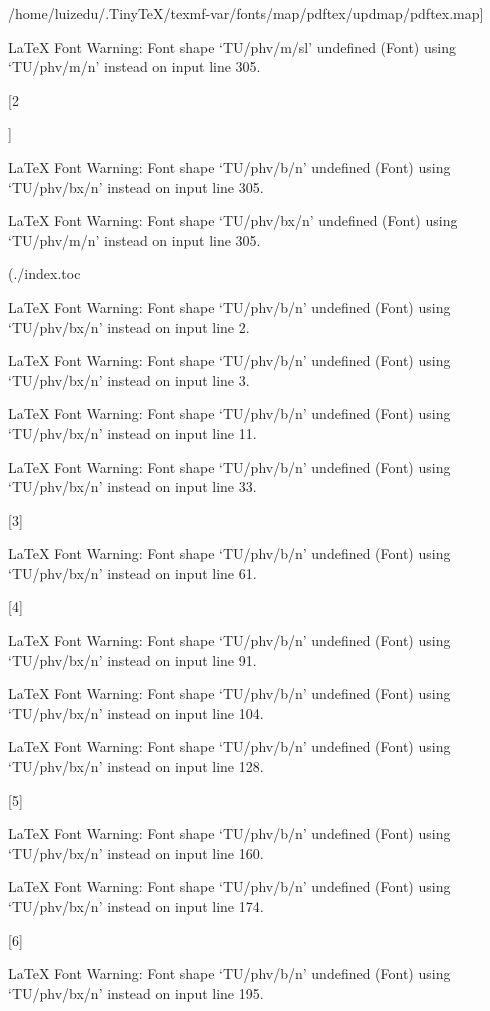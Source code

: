 {/home/luizedu/.TinyTeX/texmf-var/fonts/map/pdftex/updmap/pdftex.map}]

LaTeX Font Warning: Font shape `TU/phv/m/sl' undefined
(Font)              using `TU/phv/m/n' instead on input line 305.

[2

]

LaTeX Font Warning: Font shape `TU/phv/b/n' undefined
(Font)              using `TU/phv/bx/n' instead on input line 305.


LaTeX Font Warning: Font shape `TU/phv/bx/n' undefined
(Font)              using `TU/phv/m/n' instead on input line 305.

(./index.toc

LaTeX Font Warning: Font shape `TU/phv/b/n' undefined
(Font)              using `TU/phv/bx/n' instead on input line 2.


LaTeX Font Warning: Font shape `TU/phv/b/n' undefined
(Font)              using `TU/phv/bx/n' instead on input line 3.


LaTeX Font Warning: Font shape `TU/phv/b/n' undefined
(Font)              using `TU/phv/bx/n' instead on input line 11.


LaTeX Font Warning: Font shape `TU/phv/b/n' undefined
(Font)              using `TU/phv/bx/n' instead on input line 33.

[3]

LaTeX Font Warning: Font shape `TU/phv/b/n' undefined
(Font)              using `TU/phv/bx/n' instead on input line 61.

[4]

LaTeX Font Warning: Font shape `TU/phv/b/n' undefined
(Font)              using `TU/phv/bx/n' instead on input line 91.


LaTeX Font Warning: Font shape `TU/phv/b/n' undefined
(Font)              using `TU/phv/bx/n' instead on input line 104.


LaTeX Font Warning: Font shape `TU/phv/b/n' undefined
(Font)              using `TU/phv/bx/n' instead on input line 128.

[5]

LaTeX Font Warning: Font shape `TU/phv/b/n' undefined
(Font)              using `TU/phv/bx/n' instead on input line 160.


LaTeX Font Warning: Font shape `TU/phv/b/n' undefined
(Font)              using `TU/phv/bx/n' instead on input line 174.

[6]

LaTeX Font Warning: Font shape `TU/phv/b/n' undefined
(Font)              using `TU/phv/bx/n' instead on input line 195.


